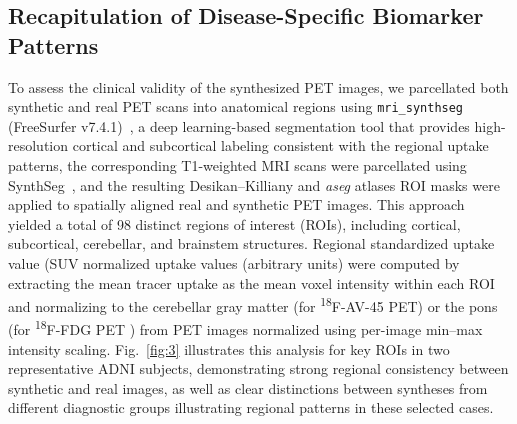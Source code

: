 \documentclass{article}
\providecommand{\DIFaddtex}[1]{{\protect\color{blue} \sf #1}} %
\providecommand{\DIFdeltex}[1]{{\protect\color{red} \scriptsize #1}} %
\providecommand{\DIFaddbegin}{} %
\providecommand{\DIFaddend}{} %
\providecommand{\DIFdelbegin}{} %
\providecommand{\DIFdelend}{} %
\providecommand{\DIFadd}[1]{\texorpdfstring{\DIFaddtex{#1}}{#1}} %
\providecommand{\DIFdel}[1]{\texorpdfstring{\DIFdeltex{#1}}{}} %
\newcommand{\DIFscaledelfig}{0.5}
\newlength{\DIFdelgraphicswidth} %
\newlength{\DIFdelgraphicsheight} %
\newcommand{\DIFaddincludegraphics}[2][]{{\color{blue}\fbox{\DIFOincludegraphics[#1]{#2}}}} %
\newcommand{\DIFdelincludegraphics}[2][]{%
\sbox{\DIFdelgraphicsbox}{\DIFOincludegraphics[#1]{#2}}%
\settoboxwidth{\DIFdelgraphicswidth}{\DIFdelgraphicsbox} %
\settoboxtotalheight{\DIFdelgraphicsheight}{\DIFdelgraphicsbox} %
\scalebox{\DIFscaledelfig}{%
\parbox[b]{\DIFdelgraphicswidth}{\usebox{\DIFdelgraphicsbox}\\[-\baselineskip] \rule{\DIFdelgraphicswidth}{0em}}\llap{\resizebox{\DIFdelgraphicswidth}{\DIFdelgraphicsheight}{%
\setlength{\unitlength}{\DIFdelgraphicswidth}%
\begin{picture}(1,1)%
\thicklines\linethickness{2pt} %
{\color[rgb]{1,0,0}\put(0,0){\framebox(1,1){}}}%
{\color[rgb]{1,0,0}\put(0,0){\line( 1,1){1}}}%
{\color[rgb]{1,0,0}\put(0,1){\line(1,-1){1}}}%
\end{picture}%
}\hspace*{3pt}}} %
} %
\DeclareRobustCommand{\DIFaddbegin}{\DIFOaddbegin \let\includegraphics\DIFaddincludegraphics} %
\DeclareRobustCommand{\DIFaddend}{\DIFOaddend \let\includegraphics\DIFOincludegraphics} %
\DeclareRobustCommand{\DIFdelbegin}{\DIFOdelbegin \let\includegraphics\DIFdelincludegraphics} %
\DeclareRobustCommand{\DIFdelend}{\DIFOaddend \let\includegraphics\DIFOincludegraphics} %
\begin{document}


\DIFaddend \subsection{Recapitulation of Disease-Specific Biomarker Patterns}
To assess \DIFdelbegin \DIFdel{the clinical validity of the synthesized PET images, we parcellated both synthetic and real PET scans into anatomical regions using \texttt{mri\_synthseg} (FreeSurfer v7.4.1)~\cite{fischl2012freesurfer,dalca2022synthseg}, a deep learning-based segmentation tool that provides high-resolution cortical and subcortical labeling consistent with the }\DIFdelend \DIFaddbegin \DIFadd{regional uptake patterns, the corresponding T1-weighted MRI scans were parcellated using SynthSeg~\cite{synthseg}, and the resulting }\DIFaddend Desikan--Killiany and \textit{aseg} \DIFdelbegin \DIFdel{atlases}\DIFdelend \DIFaddbegin \DIFadd{ROI masks were applied to spatially aligned real and synthetic PET images}\DIFaddend . This approach yielded a total of 98 distinct regions of interest (ROIs), including cortical, subcortical, cerebellar, and brainstem structures. Regional \DIFdelbegin \DIFdel{standardized uptake value  (SUV}\DIFdelend \DIFaddbegin \DIFadd{normalized uptake values (arbitrary units}\DIFaddend ) were computed \DIFdelbegin \DIFdel{by extracting the mean tracer uptake }\DIFdelend \DIFaddbegin \DIFadd{as the mean voxel intensity }\DIFaddend within each ROI \DIFdelbegin \DIFdel{and normalizing to the cerebellar gray matter (for \textsuperscript{18}F-AV-45 PET) or the pons (for \textsuperscript{18}F-FDG PET )}\DIFdelend \DIFaddbegin \DIFadd{from PET images normalized using per-image min--max intensity scaling}\DIFaddend . Fig.~\ref{fig:3} illustrates this analysis for key ROIs in two representative ADNI subjects, \DIFdelbegin \DIFdel{demonstrating strong regional consistency between synthetic and real images, as well as clear distinctions between syntheses from different diagnostic groups}\DIFdelend \DIFaddbegin \DIFadd{illustrating regional patterns in these selected cases}\DIFaddend .
\end{document}
